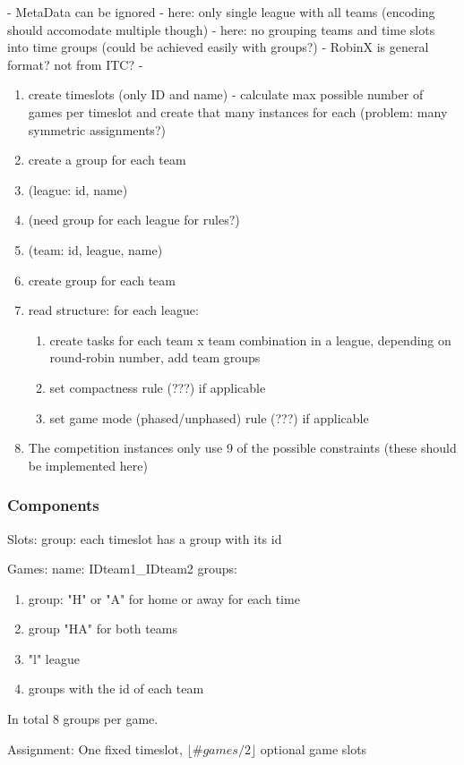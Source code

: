 - MetaData can be ignored
- here: only single league with all teams (encoding should accomodate multiple though)
- here: no grouping teams and time slots into time groups (could be achieved easily with groups?)
- RobinX is general format? not from ITC?
- 

\begin{enumerate}
\item create timeslots (only ID and name)
- calculate max possible number of games per timeslot and create that many instances for each (problem: many symmetric assignments?)
\item create a group for each team
\item (league: id, name)
\item (need group for each league for rules?)
\item (team: id, league, name)
\item create group for each team
\item read structure: for each league:
\begin{enumerate}
\item create tasks for each team x team combination in a league, depending on round-robin number, add team groups
\item set compactness rule (???) if applicable
\item set game mode (phased/unphased) rule (???) if applicable
\end{enumerate}
\item The competition instances only use 9 of the possible constraints (these should be implemented here)
\end{enumerate}


\subsubsection{Components}

Slots: 
group: each timeslot has a group with its id

Games:
name: IDteam1\_IDteam2
groups:
\begin{enumerate}
\item group: "H" or "A" for home or away for each time
\item group "HA" for both teams
\item "l" league
\item groups with the id of each team
\end{enumerate}
In total 8 groups per game.


Assignment:
One fixed timeslot, $\lfloor \#games/2\rfloor$ optional game slots


